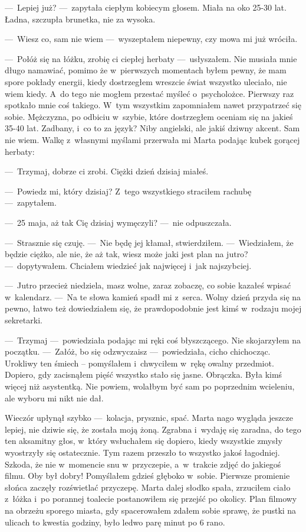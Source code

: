 ---~Lepiej już? ---~zapytała ciepłym kobiecym głosem. Miała na oko 25-30 lat. Ładna, szczupła brunetka, nie za wysoka.

---~Wiesz co, sam nie wiem ---~wyszeptałem niepewny, czy mowa mi już wróciła.

---~Połóż się na łóżku, zrobię ci ciepłej herbaty ---~usłyszałem. Nie musiała mnie długo namawiać, pomimo że w~pierwszych momentach byłem pewny, że mam spore pokłady energii, kiedy dostrzegłem wreszcie świat wszystko uleciało, nie wiem kiedy. A~do tego nie mogłem przestać myśleć o~psycholożce. Pierwszy raz spotkało mnie coś takiego. W~tym wszystkim zapomniałem nawet przypatrzeć się sobie. Mężczyzna, po odbiciu w~szybie, które dostrzegłem oceniam się na jakieś 35-40 lat. Zadbany, i~co to za język? Niby angielski, ale jakiś dziwny akcent. Sam nie wiem. Walkę z~własnymi myślami przerwała mi Marta podając kubek gorącej herbaty:

---~Trzymaj, dobrze ci zrobi. Ciężki dzień dzisiaj miałeś.

---~Powiedz mi, który dzisiaj? Z~tego wszystkiego straciłem rachubę ---~zapytałem.

---~25 maja, aż tak Cię dzisiaj wymęczyli? ---~nie odpuszczała.

---~Strasznie się czuję. ---~Nie będę jej kłamał, stwierdziłem. ---~Wiedziałem, że będzie ciężko, ale nie, że aż tak, wiesz może jaki jest plan na jutro? ---~dopytywałem. Chciałem wiedzieć jak najwięcej i~jak najszybciej.

---~Jutro przecież niedziela, masz wolne, zaraz zobaczę, co sobie kazałeś wpisać w~kalendarz. ---~Na te słowa kamień spadł mi z~serca. Wolny dzień przyda się na pewno, łatwo też dowiedziałem się, że prawdopodobnie jest kimś w~rodzaju mojej sekretarki.

---~Trzymaj ---~powiedziała podając mi ręki coś błyszczącego. Nie skojarzyłem na początku. ---~Załóż, bo się odzwyczaisz ---~powiedziała, cicho chichocząc. Urokliwy ten śmiech -- pomyślałem i~chwyciłem w~rękę owalny przedmiot. Dopiero, gdy zacisnąłem pięść wszystko stało się jasne. Obrączka. Była kimś więcej niż asystentką. Nie powiem, wolałbym być sam po poprzednim wcieleniu, ale wyboru mi nikt nie dał.

Wieczór upłynął szybko ---~kolacja, prysznic, spać. Marta nago wygląda jeszcze lepiej, nie dziwie się, że została moją żoną. Zgrabna i~wydaję się zaradna, do tego ten aksamitny głos, w~który wsłuchałem się dopiero, kiedy wszystkie zmysły wyostrzyły się ostatecznie. Tym razem przeszło to wszystko jakoś łagodniej. Szkoda, że nie w~momencie snu w~przyczepie, a~w~trakcie zdjęć do jakiegoś filmu. Oby był dobry! Pomyślałem gdzieś głęboko w~sobie. Pierwsze promienie słońca zaczęły rozświetlać przyczepę. Marta dalej słodko spała, zrzuciłem ciało z~łóżka i~po porannej toalecie postanowiłem się przejść po okolicy. Plan filmowy na obrzeżu sporego miasta, gdy spacerowałem zdałem sobie sprawę, że pustki na ulicach to kwestia godziny, było ledwo parę minut po 6 rano.

